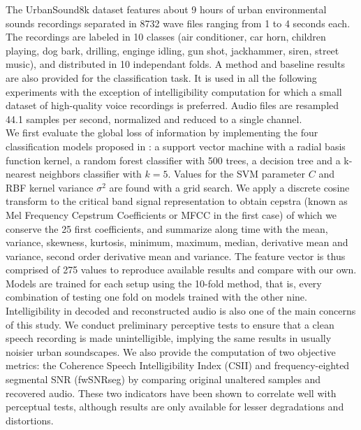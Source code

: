 \documentclass[preprint,12pt]{elsarticle}
\begin{document}
The UrbanSound8k dataset\cite{salamon2014} features about 9 hours of urban environmental sounds recordings separated in 8732 wave files ranging from 1 to 4 seconds each. The recordings are labeled in 10 classes (air conditioner, car horn, children playing, dog bark, drilling, enginge idling, gun shot, jackhammer, siren, street music), and distributed in 10 independant folds. A method and baseline results are also provided for the classification task. It is used in all the following experiments with the exception of intelligibility computation for which a small dataset of high-quality voice recordings is preferred. Audio files are resampled 44.1 samples per second, normalized and reduced to a single channel.\\

We first evaluate the global loss of information by implementing the four classification models proposed in \cite{salamon2014}: a support vector machine with a radial basis function kernel, a random forest classifier with 500 trees, a decision tree and a k-nearest neighbors classifier with $k = 5$. Values for the SVM parameter $C$ and RBF kernel variance $\sigma^2$ are found with a grid search. We apply a discrete cosine transform to the critical band signal representation to obtain cepstra (known as Mel Frequency Cepstrum Coefficients or MFCC in the first case) of which we conserve the 25 first coefficients, and summarize along time with the mean, variance, skewness, kurtosis, minimum, maximum, median, derivative mean and variance, second order derivative mean and variance. The feature vector is thus comprised of 275 values to reproduce available results and compare with our own. Models are trained for each setup using the 10-fold method, that is, every combination of testing one fold on models trained with the other nine.\\

Intelligibility in decoded and reconstructed audio is also one of the main concerns of this study. We conduct preliminary perceptive tests to ensure that a clean speech recording is made unintelligible, implying the same results in usually noisier urban soundscapes. We also provide the computation of two objective metrics: the Coherence Speech Intelligibility Index\cite{kates2005} (CSII) and frequency-eighted segmental SNR\cite{hu2008} (fwSNRseg) by comparing original unaltered samples and recovered audio. These two indicators have been shown to correlate well with perceptual tests\cite{ma2009}, although results are only available for lesser degradations and distortions.\\
\end{document}
